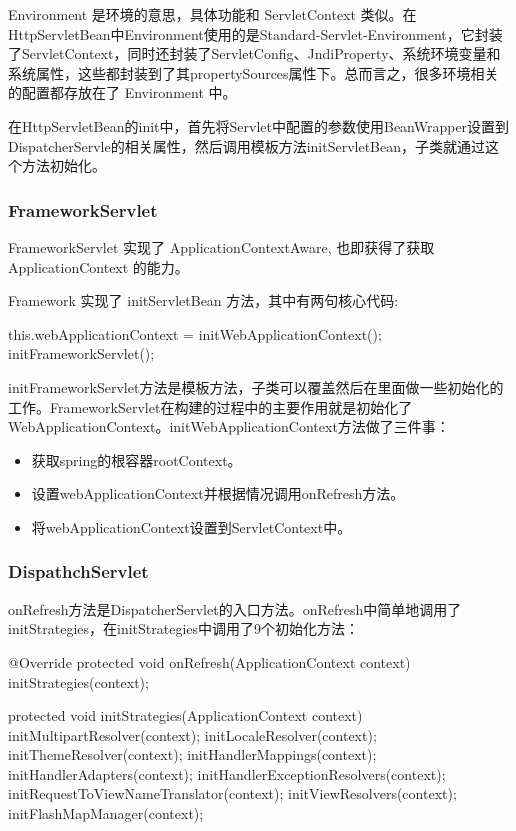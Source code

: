 Environment 是环境的意思，具体功能和 ServletContext 类似。在HttpServletBean中Environment使用的是Standard-Servlet-Environment，它封装了ServletContext，同时还封装了ServletConfig、JndiProperty、系统环境变量和系统属性，这些都封装到了其propertySources属性下。总而言之，很多环境相关的配置都存放在了 Environment 中。

在HttpServletBean的init中，首先将Servlet中配置的参数使用BeanWrapper设置到DispatcherServle的相关属性，然后调用模板方法initServletBean，子类就通过这个方法初始化。

\subsubsection{FrameworkServlet}

FrameworkServlet 实现了 ApplicationContextAware, 也即获得了获取 ApplicationContext 的能力。

Framework 实现了 initServletBean 方法，其中有两句核心代码:
\begin{Java}
this.webApplicationContext = initWebApplicationContext();
initFrameworkServlet();
\end{Java}

initFrameworkServlet方法是模板方法，子类可以覆盖然后在里面做一些初始化的工作。FrameworkServlet在构建的过程中的主要作用就是初始化了WebApplicationContext。initWebApplicationContext方法做了三件事：

\begin{itemize}
    \item 获取spring的根容器rootContext。
    \item 设置webApplicationContext并根据情况调用onRefresh方法。
    \item 将webApplicationContext设置到ServletContext中。
\end{itemize}

\subsubsection{DispathchServlet}

onRefresh方法是DispatcherServlet的入口方法。onRefresh中简单地调用了initStrategies，在initStrategies中调用了9个初始化方法：

\begin{Java}
@Override
protected void onRefresh(ApplicationContext context) {
	initStrategies(context);
}

protected void initStrategies(ApplicationContext context) {
	initMultipartResolver(context);
	initLocaleResolver(context);
	initThemeResolver(context);
	initHandlerMappings(context);
	initHandlerAdapters(context);
	initHandlerExceptionResolvers(context);
	initRequestToViewNameTranslator(context);
	initViewResolvers(context);
	initFlashMapManager(context);
}
\end{Java}

